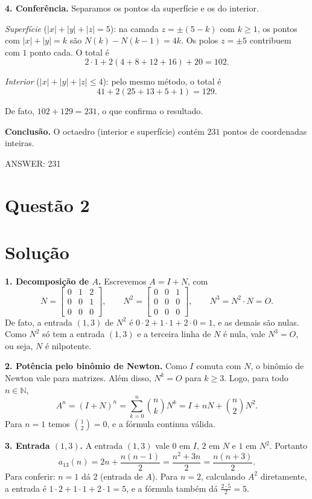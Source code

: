 \documentclass{article}%
\begin{document}
\textbf{4. Conferência.} Separamos os pontos da superfície e os do interior.

\emph{Superfície} ($|x|+|y|+|z|=5$): na camada $z=\pm(5-k)$ com $k\ge 1$, os pontos com $|x|+|y|=k$ são $N(k)-N(k-1)=4k$. Os polos $z=\pm5$ contribuem com $1$ ponto cada. O total é
\[
2\cdot 1+2(4+8+12+16)+20=102 .
\]

\emph{Interior} ($|x|+|y|+|z|\le 4$): pelo mesmo método, o total é
\[
41+2(25+13+5+1)=129 .
\]

De fato, $102+129=231$, o que confirma o resultado.

\textbf{Conclusão.} O octaedro (interior e superfície) contém $231$ pontos de coordenadas inteiras.

ANSWER: 231%
\newpage%
\section*{Questão 2}

\section*{Solução}

\textbf{1. Decomposição de $A$.} Escrevemos $A = I + N$, com
\[
N=\begin{bmatrix} 0 & 1 & 2 \\ 0 & 0 & 1 \\ 0 & 0 & 0 \end{bmatrix},\qquad
N^2=\begin{bmatrix} 0 & 0 & 1 \\ 0 & 0 & 0 \\ 0 & 0 & 0 \end{bmatrix},\qquad
N^3 = N^2\cdot N = O .
\]
De fato, a entrada $(1,3)$ de $N^2$ é $0\cdot 2 + 1\cdot 1 + 2\cdot 0 = 1$, e as demais são nulas. Como $N^2$ só tem a entrada $(1,3)$ e a terceira linha de $N$ é nula, vale $N^3=O$, ou seja, $N$ é nilpotente.

\textbf{2. Potência pelo binômio de Newton.} Como $I$ comuta com $N$, o binômio de Newton vale para matrizes. Além disso, $N^k=O$ para $k\ge 3$. Logo, para todo $n\in\mathbb{N}$,
\[
A^n=(I+N)^n=\sum_{k=0}^{n}\binom{n}{k}N^k = I + nN + \binom{n}{2}N^2 .
\]
Para $n=1$ temos $\binom{1}{2}=0$, e a fórmula continua válida.

\textbf{3. Entrada $(1,3)$.} A entrada $(1,3)$ vale $0$ em $I$, $2$ em $N$ e $1$ em $N^2$. Portanto
\[
a_{13}(n) = 2n + \frac{n(n-1)}{2} = \frac{n^2+3n}{2} = \frac{n(n+3)}{2}.
\]
Para conferir: $n=1$ dá $2$ (entrada de $A$). Para $n=2$, calculando $A^2$ diretamente, a entrada é $1\cdot 2+1\cdot 1+2\cdot 1=5$, e a fórmula também dá $\frac{2\cdot 5}{2}=5$.
\end{document}
